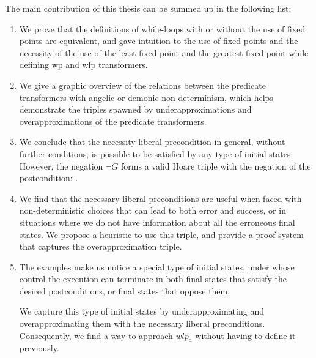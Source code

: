 The main contribution of this thesis can be summed up in the following list: 
\begin{enumerate}
    \item We prove that the definitions of while-loops with or without the use of fixed points are equivalent, and gave intuition to the use of fixed points and the necessity of the use of the least fixed point and the greatest fixed point while defining wp and wlp transformers. 
    \item We give a graphic overview of the relations between the predicate transformers with angelic or demonic non-determinism, which helps demonstrate the triples spawned by underapproximations and overapproximations of the predicate transformers. 
    \item We conclude that the necessity liberal precondition in general, without further conditions, is possible to be satisfied by any type of initial states. However, the negation $\neg G$ forms a valid Hoare triple with the negation of the postcondition: . 
    \item We find that the necessary liberal preconditions are useful when faced with non-deterministic choices that can lead to both error and success, or in situations where we do not have information about all the erroneous final states. We propose a heuristic to use this triple, and provide a proof system that captures the overapproximation triple. 
    \item The examples make us notice a special type of initial states, under whose control the execution can terminate in both final states that satisfy the desired postconditions, or final states that oppose them. 
    
    We capture this type of initial states by underapproximating and overapproximating them with the necessary liberal preconditions. Consequently, we find a way to approach $wlp_a$ without having to define it previously. 
\end{enumerate}


